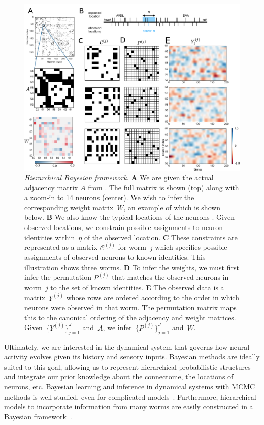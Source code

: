 \documentclass{article}
\begin{document}
\begin{figure}[t]
  \centering
  \includegraphics[width=5in]{Figure1.pdf} 
  \caption{\textit{Hierarchical Bayesian framework}.  \textbf{A} We
    are given the actual adjacency matrix $A$ from
    \citep{varshney2011structural}. The full matrix is shown (top)
    along with a zoom-in to 14 neurons (center).  We wish to infer the
    corresponding weight matrix~$W$, an example of which is shown
    below.  \textbf{B} We also know the typical locations of the
    neurons \citep{white1986structure,wormatlas}. Given observed
    locations, we constrain possible assignments to neuron identities
    within~$\eta$ of the observed location.  \textbf{C} These
    constraints are represented as a matrix $\mathcal{C}^{(j)}$ for
    worm~$j$ which specifies possible assignments of observed neurons
    to known identities. This illustration shows three worms.
    \textbf{D} To infer the weights, we must first infer the
    permutation $P^{(j)}$ that matches the observed neurons in
    worm~$j$ to the set of known identities.  \textbf{E} The observed
    data is a matrix~$Y^{(j)}$ whose rows are ordered according to the
    order in which neurons were observed in that worm.  The
    permutation matrix maps this to the canonical ordering of the
    adjacency and weight matrices. Given~$\{Y^{(j)}\}_{j=1}^J$
    and~$A$, we infer~$\{P^{(j)}\}_{j=1}^J$ and~$W$.}
  \vspace{-1em}
\label{fig:1}
\end{figure}

Ultimately, we are interested in the dynamical system that governs how
neural activity evolves given its history and sensory inputs.
Bayesian methods are ideally suited to this goal, allowing us to
represent hierarchical probabilistic structures and integrate our
prior knowledge about the connectome, the locations of neurons, etc.
Bayesian learning and inference in dynamical systems with MCMC methods
is well-studied, even for complicated
models~\citep{Freitas2001,Paninski2010}. Furthermore, hierarchical
models to incorporate information from many worms are easily
constructed in a Bayesian framework~\citep{Gelman2014}.
\end{document}
